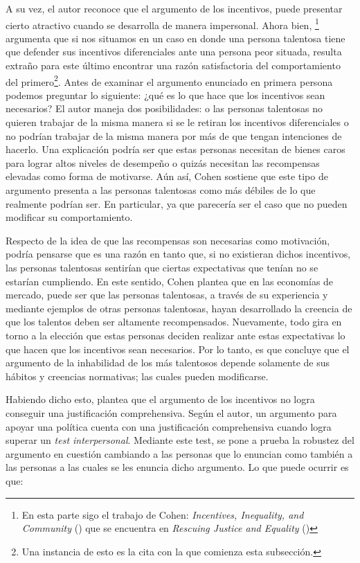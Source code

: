 A su vez, el autor reconoce que el argumento de los incentivos, puede presentar cierto atractivo cuando se desarrolla de manera impersonal. Ahora bien, \citet{Cohen_2008}\footnote{En esta parte sigo el trabajo de Cohen: \textit{Incentives, Inequality, and Community} (\citeyear{Cohen_1992}) que se encuentra en \textit{Rescuing Justice and Equality} (\citeyear{Cohen_2008})} argumenta que si nos situamos en un caso en donde una persona talentosa tiene que defender sus incentivos diferenciales ante una persona peor situada, resulta extraño para este último encontrar una razón satisfactoria del comportamiento del primero\footnote{Una instancia de esto es la cita con la que comienza esta subsección.}. Antes de examinar el argumento enunciado en primera persona podemos preguntar lo siguiente: ¿qué es lo que hace que los incentivos sean necesarios? El autor maneja dos posibilidades: o las personas talentosas no quieren trabajar de la misma manera si se le retiran los incentivos diferenciales o no podrían trabajar de la misma manera por más de que tengan intenciones de hacerlo. Una explicación podría ser que estas personas necesitan de bienes caros para lograr altos niveles de desempeño o quizás necesitan las recompensas elevadas como forma de motivarse. Aún así, Cohen sostiene que este tipo de argumento presenta a las personas talentosas como más débiles de lo que realmente podrían ser. En particular, ya que parecería ser el caso que no pueden modificar su comportamiento.  

Respecto de la idea de que las recompensas son necesarias como motivación, podría pensarse que es una razón en tanto que, si no existieran dichos incentivos, las personas talentosas sentirían que ciertas expectativas que tenían no se estarían cumpliendo. En este sentido, Cohen plantea que en las economías de mercado, puede ser que las personas talentosas, a través de su experiencia y mediante ejemplos de otras personas talentosas, hayan desarrollado la creencia de que los talentos deben ser altamente recompensados. Nuevamente, todo gira en torno a la elección que estas personas deciden realizar ante estas expectativas lo que hacen que los incentivos sean necesarios. Por lo tanto, es que \citet{Cohen_2008} concluye que el argumento de la inhabilidad de los más talentosos depende solamente de sus hábitos y creencias normativas; las cuales pueden modificarse.

Habiendo dicho esto, \citet{Cohen_2008} plantea que el argumento de los incentivos no logra conseguir una justificación comprehensiva. Según el autor, un argumento para apoyar una política cuenta con una justificación comprehensiva cuando logra superar un \textit{test interpersonal}. Mediante este test, se pone a prueba la robustez del argumento en cuestión cambiando a las personas que lo enuncian como también a las personas a las cuales se les enuncia dicho argumento. Lo que puede ocurrir es que:

